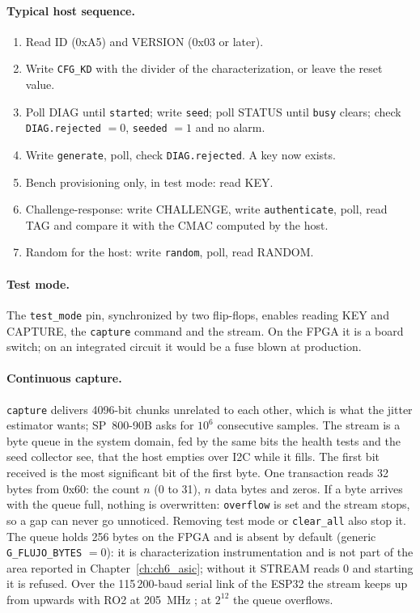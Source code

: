 \paragraph{Typical host sequence.}
\begin{enumerate}
\item Read ID (0xA5) and VERSION (0x03 or later).
\item Write \texttt{CFG\_KD} with the divider of the characterization, or
  leave the reset value.
\item Poll DIAG until \texttt{started}; write \texttt{seed}; poll STATUS
  until \texttt{busy} clears; check \texttt{DIAG.rejected} $= 0$,
  \texttt{seeded} $= 1$ and no alarm.
\item Write \texttt{generate}, poll, check \texttt{DIAG.rejected}. A key
  now exists.
\item Bench provisioning only, in test mode: read KEY.
\item Challenge-response: write CHALLENGE, write \texttt{authenticate},
  poll, read TAG and compare it with the \ac{CMAC} computed by the host.
\item Random for the host: write \texttt{random}, poll, read RANDOM.
\end{enumerate}

\paragraph{Test mode.} The \texttt{test\_mode} pin, synchronized by two
flip-flops, enables reading KEY and CAPTURE, the \texttt{capture}
command and the stream. On the \ac{FPGA} it is a board switch; on an
integrated circuit it would be a fuse blown at production.

\paragraph{Continuous capture.} \texttt{capture} delivers 4096-bit chunks
unrelated to each other, which is what the jitter estimator wants;
SP~800-90B asks for $10^6$ consecutive samples. The stream is a byte
queue in the system domain, fed by the same bits the health tests and the
seed collector see, that the host empties over \ac{I2C} while it fills.
The first bit received is the most significant bit of the first byte. One
transaction reads 32 bytes from 0x60: the count $n$ (0 to 31), $n$ data
bytes and zeros. If a byte arrives with the queue full, nothing is
overwritten: \texttt{overflow} is set and the stream stops, so a gap can
never go unnoticed. Removing test mode or \texttt{clear\_all} also stop
it. The queue holds 256 bytes on the \ac{FPGA} and is absent by default
(generic \texttt{G\_FLUJO\_BYTES} $= 0$): it is characterization
instrumentation and is not part of the area reported in
Chapter~\ref{ch:ch6_asic}; without it STREAM reads 0 and starting it is
refused. Over the 115\,200-baud serial link of the ESP32 the stream keeps
up from  upwards with RO2 at 205~MHz \meas{}; at $2^{12}$ the queue
overflows.


